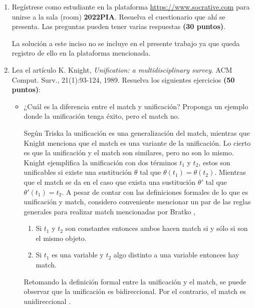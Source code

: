 \begin{enumerate}
    \item Regístrese como estudiante en la plataforma \url{https://www.socrative.com} para unirse a la sala (room) \textbf{2022PIA}. Resuelva el cuestionario que ahí se presenta. Las preguntas pueden tener varias respuestas \textbf{(30 puntos)}.
    \begin{solution}
        La solución a este inciso no se incluye en el presente trabajo ya que queda registro de ello en la plataforma mencionada.
    \end{solution}

    \item Lea el artículo K. Knight, \textit{Unification: a multidisciplinary survey}. ACM Comput. Surv., 21(1):93-124, 1989. Resuelva los siguientes ejercicios \textbf{(50 puntos)}:
    \begin{itemize}
        \item ¿Cuál es la diferencia entre el match y unificación? Proponga un ejemplo donde la unificación tenga éxito, pero el match no.
        \begin{solution}
            Según Triska \cite{triska2005prolog} la unificación es una generalización del match, mientras que Knight \cite{knight1989unification} menciona que el match es una variante de la unificación. Lo cierto es que la unificación y el match son similares, pero no son lo mismo. Knight ejemplifica la unificación con dos términos $t_1$ y $t_2$, estos son unificables si existe una sustitución $\theta$ tal que $\theta(t_1) = \theta(t_2)$. Mientras que el match se da en el caso que exista una sustitución $\theta'$ tal que $\theta'(t_1) = t_2$. A pesar de contar con las definiciones formales de lo que es unificación y match, considero conveniente mencionar un par de las reglas generales para realizar match mencionadas por Bratko \cite{bratko2012prolog},
                \begin{enumerate}
                    \item Si $t_1$ y $t_2$ son constantes entonces ambos hacen match si y sólo si son el mismo objeto.
                    \item Si $t_1$ es una variable y $t_2$ algo distinto a una variable entonces hay match.
                \end{enumerate}
            Retomando la definición formal entre la unificación y el match, se puede observar que la unificación es bidireccional. Por el contrario, el match es unidireccional \cite{knight1989unification}.


\end{solution}
\end{itemize}
\end{enumerate}
